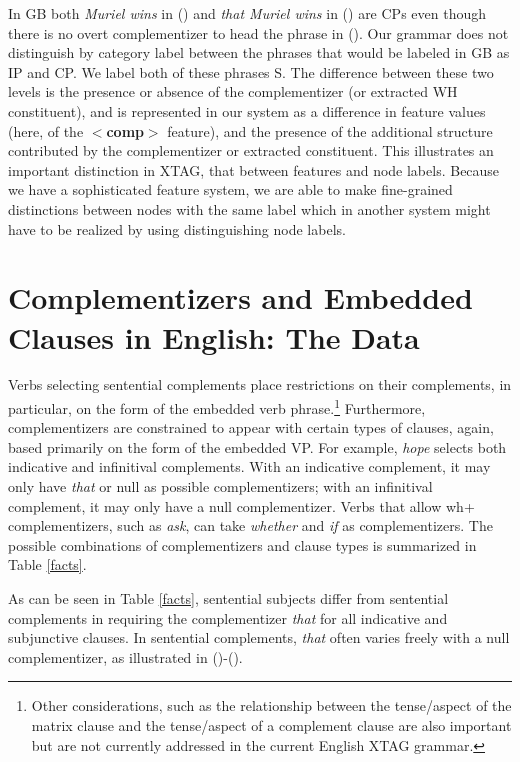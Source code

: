 
 In GB both {\it Muriel wins} in () and {\it that Muriel wins} in
() are CPs even though there is no overt complementizer to head the
phrase in ().  Our grammar does not distinguish by category label
between the phrases that would be labeled in GB as IP and CP.  We label
both of these phrases S.  The difference between these two levels is the
presence or absence of the complementizer (or extracted WH constituent), and is
represented in our system as a difference in feature values (here, of the {\bf
$<$comp$>$} feature), and the presence of the additional structure contributed
by the complementizer or extracted constituent.  This illustrates an important
distinction in XTAG, that between features and node labels.  Because we have a
sophisticated feature system, we are able to make fine-grained distinctions
between nodes with the same label which in another system might have to be
realized by using distinguishing node labels.
 
\section{Complementizers and Embedded Clauses in English:  The
Data}
\label{data}

Verbs selecting sentential complements place restrictions on
their complements, in particular, on the form of the embedded verb
phrase.\footnote{Other considerations, such as the relationship between the
tense/aspect of the matrix clause and the tense/aspect of a complement clause
are also important but are not currently addressed in the current English XTAG
grammar.}  Furthermore, complementizers are constrained to appear with certain
types of clauses, again, based primarily on the form of the embedded VP.  For
example, {\it hope\/} selects both indicative and infinitival complements. With
an indicative complement, it may only have {\it that\/} or null as possible
complementizers; with an infinitival complement, it may only have a null
complementizer.  Verbs that allow wh+ complementizers, such as {\it ask}, can
take {\it whether} and {\it if} as complementizers.  The possible combinations
of complementizers and clause types is summarized in Table \ref{facts}.

As can be seen in Table \ref{facts}, sentential subjects differ from
sentential complements in requiring the complementizer {\it that\/}
for all indicative and subjunctive clauses.  In sentential complements,
{\it that\/} often varies freely with a null complementizer, as
illustrated in ()-().

